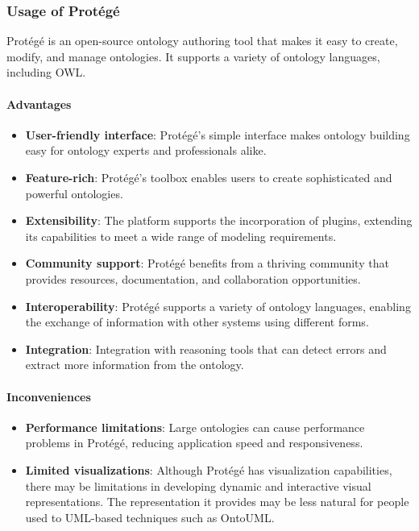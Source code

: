     \subsubsection{Usage of Protégé}
    Protégé is an open-source ontology authoring tool that makes it easy to create, modify, and manage ontologies. It supports a variety of ontology languages, including OWL.
    
    \paragraph{Advantages}
    \begin{itemize}
        \item \textbf{User-friendly interface}: Protégé's simple interface makes ontology building easy for ontology experts and professionals alike.
        \item \textbf{Feature-rich}: Protégé's toolbox enables users to create sophisticated and powerful ontologies.
        \item \textbf{Extensibility}: The platform supports the incorporation of plugins, extending its capabilities to meet a wide range of modeling requirements.
        \item \textbf{Community support}: Protégé benefits from a thriving community that provides resources, documentation, and collaboration opportunities.
        \item \textbf{Interoperability}: Protégé supports a variety of ontology languages, enabling the exchange of information with other systems using different forms.
        \item \textbf{Integration}:  Integration with reasoning tools that can detect errors and extract more information from the ontology.
    \end{itemize}
    
    \paragraph{Inconveniences}
    \begin{itemize}
        \item \textbf{Performance limitations}: Large ontologies can cause performance problems in Protégé, reducing application speed and responsiveness.
        \item \textbf{Limited visualizations}: Although Protégé has visualization capabilities, there may be limitations in developing dynamic and interactive visual representations. The representation it provides may be less natural for people used to UML-based techniques such as OntoUML.
    \end{itemize}
    

